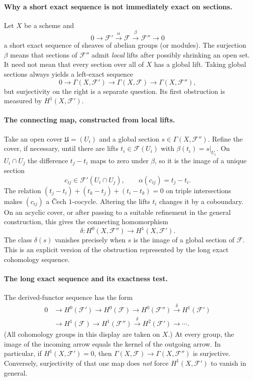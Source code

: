 \paragraph{Why a short exact sequence is not immediately exact on sections.}
Let $X$ be a scheme and
\[
  0\longrightarrow\mathcal F'\xrightarrow{\alpha}\mathcal F
   \xrightarrow{\beta}\mathcal F''\longrightarrow0
\]
a short exact sequence of sheaves of abelian groups (or modules).
The surjection $\beta$ means that sections of $\mathcal F''$ admit
\emph{local} lifts after possibly shrinking an open set.  It need
not mean that every section over all of $X$ has a global lift.
Taking global sections always yields a left-exact sequence
\[
0\longrightarrow\Gamma(X,\mathcal F')
 \longrightarrow\Gamma(X,\mathcal F)
 \longrightarrow\Gamma(X,\mathcal F''),
\]
but surjectivity on the right is a separate question.  Its first
obstruction is measured by $H^1(X,\mathcal F')$.

\paragraph{The connecting map, constructed from local lifts.}
Take an open cover $\mathfrak U=(U_i)$ and a global section
$s\in\Gamma(X,\mathcal F'')$.  Refine the cover, if necessary,
until there are lifts $t_i\in\mathcal F(U_i)$ with
$\beta(t_i)=s|_{U_i}$.  On $U_i\cap U_j$ the difference
$t_j-t_i$ maps to zero under $\beta$, so it is the image of a
unique section
\[
 c_{ij}\in\mathcal F'(U_i\cap U_j),
 \qquad\alpha(c_{ij})=t_j-t_i.
\]
The relation
$(t_j-t_i)+(t_k-t_j)+(t_i-t_k)=0$ on triple intersections
makes $(c_{ij})$ a \v{C}ech $1$-cocycle.  Altering the lifts
$t_i$ changes it by a coboundary.  On an acyclic cover, or
after passing to a suitable refinement in the general
construction, this gives the connecting homomorphism
\[
 \delta:H^0(X,\mathcal F'')\longrightarrow H^1(X,\mathcal F').
\]
The class $\delta(s)$ vanishes precisely when $s$ is the image
of a global section of $\mathcal F$.  This is an explicit
version of the obstruction represented by the long exact
cohomology sequence.

\paragraph{The long exact sequence and its exactness test.}
The derived-functor sequence has the form
\[
\begin{aligned}
0&\to H^0(\mathcal F')\to H^0(\mathcal F)\to H^0(\mathcal F'')
 \xrightarrow{\delta} H^1(\mathcal F')\\
 &\to H^1(\mathcal F)\to H^1(\mathcal F'')
 \xrightarrow{\delta}H^2(\mathcal F')\to\cdots .
\end{aligned}
\]
(All cohomology groups in this display are taken on $X$.)
At every group, the image of the incoming arrow equals the
kernel of the outgoing arrow.  In particular, if
$H^1(X,\mathcal F')=0$, then
$\Gamma(X,\mathcal F)\to\Gamma(X,\mathcal F'')$ is surjective.
Conversely, surjectivity of that one map does \emph{not}
force $H^1(X,\mathcal F')$ to vanish in general.

